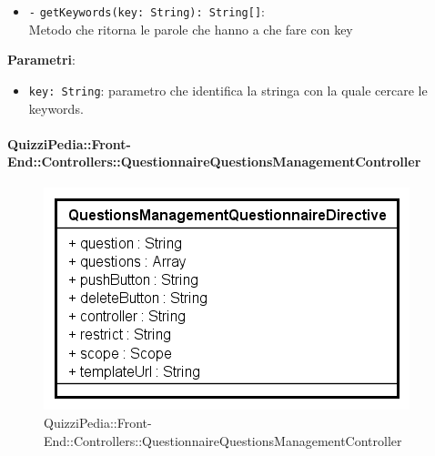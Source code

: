 \begin{itemize}
\begin{itemize}
\begin{itemize}
		\end{itemize}
		\item \texttt{-} \texttt{getKeywords(key: String): String[]}: \\ Metodo che ritorna le parole che hanno a che fare con key
	\end{itemize}
	\textbf{Parametri}:
	\begin{itemize}
		\item \texttt{key: String}: parametro che identifica la stringa con la quale cercare le keywords. 
	\end{itemize}
\end{itemize}

\paragraph{QuizziPedia::Front-End::Controllers::QuestionnaireQuestionsManagementController}
\begin{figure} [ht]
	\centering
	\includegraphics[scale=0.45]{UML/Classi/Front-End/QuizziPedia_Front-end_Controller_QuestionnaireQuestionsManagementController.png}
	\caption{QuizziPedia::Front-End::Controllers::QuestionnaireQuestionsManagementController}
\end{figure} \FloatBarrier
